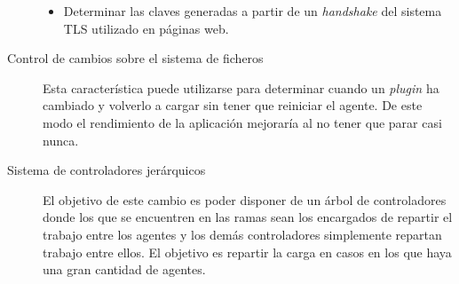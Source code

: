 \begin{description}
\begin{itemize}
		\item Determinar las claves generadas a partir de un \emph{handshake} del sistema TLS utilizado en páginas web.
	\end{itemize}

	\item[Control de cambios sobre el sistema de ficheros] Esta característica puede utilizarse para determinar cuando un \emph{plugin} ha cambiado y volverlo a cargar sin tener que reiniciar el agente. De este modo el rendimiento de la aplicación mejoraría al no tener que parar casi nunca.
	
	\item[Sistema de controladores jerárquicos] El objetivo de este cambio es poder disponer de un árbol de controladores donde los que se encuentren en las ramas sean los encargados de repartir el trabajo entre los agentes y los demás controladores simplemente repartan trabajo entre ellos. El objetivo es repartir la carga en casos en los que haya una gran cantidad de agentes.
\end{description}